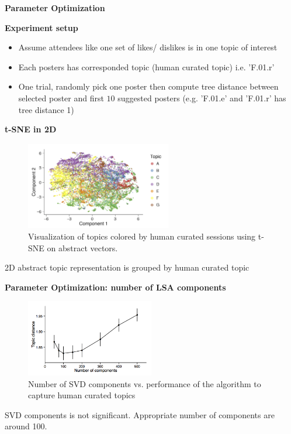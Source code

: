 \begin{frame}{\textbf{Parameter Optimization}}

\textbf{Experiment setup}

\begin{itemize}
\item Assume attendees like one set of likes/ dislikes is in one topic of interest
\item Each posters has corresponded topic (human curated topic) i.e. 'F.01.r'
\item One trial, randomly pick one poster then compute tree distance between selected poster and first $10$ suggested posters (e.g. 'F.01.e' and 'F.01.r' has tree distance 1)
\end{itemize}

\end{frame}


\begin{frame}{\textbf{t-SNE in 2D}}

\begin{figure}
\includegraphics[width=2.5in]{images/tsne}\\
\tiny{Visualization of topics colored by human curated sessions using t-SNE on abstract vectors.}
\end{figure}

2D abstract topic representation is grouped by human curated topic

\end{frame}


\begin{frame}{\textbf{Parameter Optimization: number of LSA components}}

\begin{figure}
\includegraphics[width=2.2in]{images/performance_vs_components}\\
\tiny{Number of SVD components vs. performance of the algorithm to capture human curated topics}
\end{figure}

SVD components is not significant. Appropriate number of components are around 100.

\end{frame}


